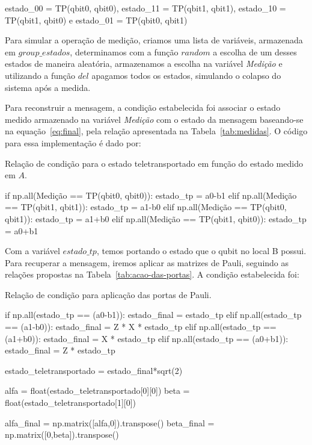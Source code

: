 \begin{center}
\begin{tiny}estado\_00 = TP(qbit0, qbit0), estado\_11 = TP(qbit1, qbit1),\linebreak
estado\_10 = TP(qbit1, qbit0) e \quad estado\_01 = TP(qbit0, qbit1)\end{tiny}
\end{center}

Para simular a operação de medição, criamos uma lista de variáveis, armazenada em \textit{$group\_estados$}, determinamos com a função \textit{$random$} a escolha de um desses estados de maneira aleatória, armazenamos a escolha na variável \textit{Medição} e utilizando a função \textit{$del$} apagamos todos os estados, simulando o colapso do sistema após a medida.

Para reconstruir a mensagem, a condição estabelecida foi associar o estado medido armazenado na variável \textit{Medição} com o estado da mensagem baseando-se na equação~\eqref{eq:final}, pela relação apresentada na Tabela~\ref{tab:medidas}. O código para essa implementação é dado por:

\begin{listing}[ht!]
  \caption{Relação de condição para o estado teletransportado em função do estado medido em \(A\).}
  \begin{pycode}
      if  np.all(Medição == TP(qbit0, qbit0)):
          estado_tp = a0-b1
      elif np.all(Medição == TP(qbit1, qbit1)):
          estado_tp = a1-b0
      elif np.all(Medição == TP(qbit0, qbit1)):
          estado_tp = a1+b0
      elif np.all(Medição == TP(qbit1, qbit0)):
          estado_tp = a0+b1
  \end{pycode}
\end{listing}

Com a variável \textit{$estado\_tp$}, temos portando o estado que o qubit no local B possui. Para recuperar a mensagem, iremos aplicar as matrizes de Pauli, seguindo as relações propostas na Tabela~\ref{tab:acao-das-portas}. A condição estabelecida foi:

\begin{listing}[ht!]
  \caption{Relação de condição para aplicação das portas de Pauli.}
  \begin{pycode}
      if np.all(estado_tp == (a0-b1)):
          estado_final = estado_tp
      elif np.all(estado_tp == (a1-b0)):
          estado_final = Z * X * estado_tp
      elif np.all(estado_tp == (a1+b0)):
          estado_final = X * estado_tp
      elif np.all(estado_tp == (a0+b1)):
          estado_final = Z * estado_tp
    
      estado_teletransportado = estado_final*sqrt(2)

      alfa = float(estado_teletransportado[0][0])
      beta = float(estado_teletransportado[1][0])

      alfa_final = np.matrix([alfa,0]).transpose()
      beta_final = np.matrix([0,beta]).transpose()
  \end{pycode}
\end{listing}

